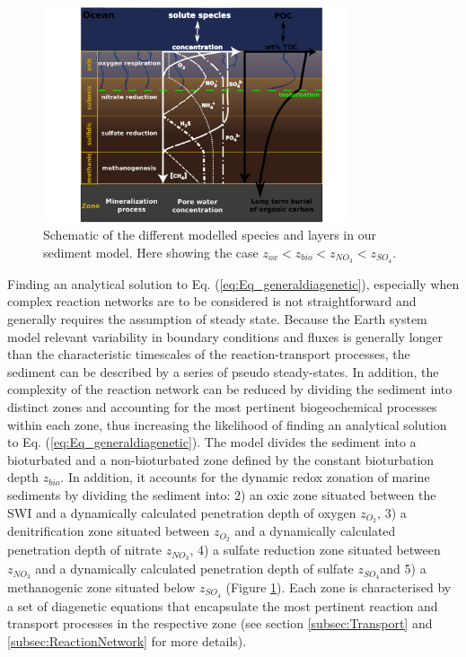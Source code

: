 \documentclass[gmd, manuscript]{copernicus}
\begin{document}
\begin{figure}[htbp]
\begin{center}
	\includegraphics[width=0.8\textwidth]{figures/Sediment-model-with-profiles-rotated90.pdf}
	\caption{Schematic of the different modelled species and layers in our sediment model. Here showing the case $z_{ox} < z_{bio} < z_{NO_3} < z_{SO_4}$.}
	\label{fig:Sediment_layers}
	\end{center}
\end{figure}

Finding an analytical solution to  Eq. (\ref{eq:Eq_generaldiagenetic}), especially when complex reaction networks are to be considered is not straightforward and generally requires the assumption of steady state. 
Because the Earth system model relevant variability in boundary conditions and fluxes is generally longer than the characteristic timescales of the reaction-transport processes, the sediment can be described by a 
series of pseudo steady-states. In addition, the complexity of the reaction network can be reduced by dividing the sediment into distinct zones and accounting for the most pertinent biogeochemical processes 
within each zone, thus increasing the likelihood of finding an analytical solution to Eq. (\ref{eq:Eq_generaldiagenetic}). The model divides the sediment into a bioturbated and a non-bioturbated zone 
defined by the constant bioturbation depth $z_{bio}$. In addition, it accounts for the dynamic redox zonation of marine sediments by dividing the sediment into: 2) an oxic zone situated between the 
SWI and a dynamically calculated penetration depth of oxygen $z_{O_2}$, 3) a denitrification zone situated between $z_{O_2}$ and a dynamically calculated penetration depth of nitrate $z_{NO_3}$, 4) 
a sulfate reduction zone situated between $z_{NO_3}$ and a dynamically calculated penetration depth of sulfate $z_{SO_4}$and 5) a methanogenic zone situated below $z_{SO_4}$ (Figure \ref{fig:Sediment_layers}). 
Each zone is characterised by a set of diagenetic equations that encapsulate the most pertinent reaction and transport processes in the respective zone (see section \ref{subsec:Transport} and \ref{subsec:ReactionNetwork} 
for more details). 
\end{document}
